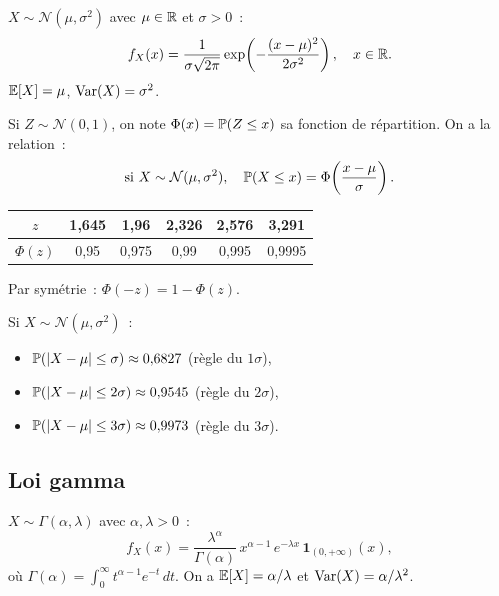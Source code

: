 \begin{definition}
$X \sim \mathcal{N}(\mu, \sigma^2)$ avec $\mu \in \mathbb{R}$ et $\sigma > 0$~:
\[
    f_X(x) = \frac{1}{\sigma\sqrt{2\pi}}
    \exp\!\left(-\frac{(x-\mu)^2}{2\sigma^2}\right), \quad x \in \mathbb{R}.
\]
$\mathbb{E}[X] = \mu$, $\mathrm{Var}(X) = \sigma^2$.
\end{definition}

\begin{definition}
Si $Z \sim \mathcal{N}(0,1)$, on note $\Phi(x) = \mathbb{P}(Z \leq x)$ sa fonction de
r\'epartition. On a la relation~:
\[
    \text{si } X \sim \mathcal{N}(\mu, \sigma^2), \quad
    \mathbb{P}(X \leq x) = \Phi\!\left(\frac{x - \mu}{\sigma}\right).
\]
\end{definition}

\begin{formules}[title=\textbf{Valeurs cl\'es de $\Phi$}]
\begin{center}
\renewcommand{\arraystretch}{1.3}
\begin{tabular}{cccccc}
    \toprule
    $z$ & 1{,}645 & 1{,}96 & 2{,}326 & 2{,}576 & 3{,}291 \\
    \midrule
    $\Phi(z)$ & 0{,}95 & 0{,}975 & 0{,}99 & 0{,}995 & 0{,}9995 \\
    \bottomrule
\end{tabular}
\end{center}
Par sym\'etrie~: $\Phi(-z) = 1 - \Phi(z)$.
\end{formules}

\begin{proposition}
Si $X \sim \mathcal{N}(\mu, \sigma^2)$~:
\begin{itemize}
    \item $\mathbb{P}(\left| X - \mu \right| \leq \sigma) \approx 0{,}6827$ \quad (r\`egle du $1\sigma$),
    \item $\mathbb{P}(\left| X - \mu \right| \leq 2\sigma) \approx 0{,}9545$ \quad (r\`egle du $2\sigma$),
    \item $\mathbb{P}(\left| X - \mu \right| \leq 3\sigma) \approx 0{,}9973$ \quad (r\`egle du $3\sigma$).
\end{itemize}
\end{proposition}

\subsection{Loi gamma}

\begin{definition}[Gamma]
$X \sim \Gamma(\alpha, \lambda)$ avec $\alpha, \lambda > 0$~:
\[
    f_X(x) = \frac{\lambda^\alpha}{\Gamma(\alpha)}\, x^{\alpha - 1}\, e^{-\lambda x}\,
    \mathbf{1}_{(0,+\infty)}(x),
\]
o\`u $\Gamma(\alpha) = \int_0^{\infty} t^{\alpha-1} e^{-t}\, dt$. On a
$\mathbb{E}[X] = \alpha/\lambda$ et $\mathrm{Var}(X) = \alpha/\lambda^2$.
\end{definition}

